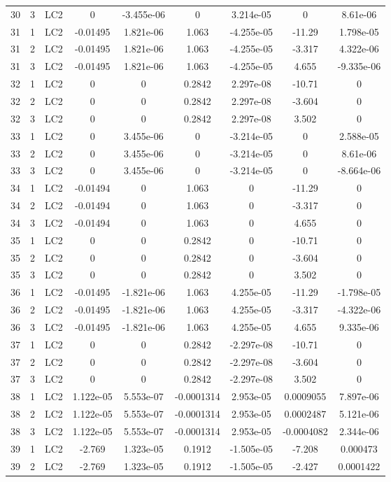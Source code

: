 \documentclass{article}%
\begin{document}
\begin{longtable}{| c c c | c c c c c c |}
30&3&LC2&0&{-}3.455e{-}06&0&3.214e{-}05&0&8.61e{-}06\\%
31&1&LC2&{-}0.01495&1.821e{-}06&1.063&{-}4.255e{-}05&{-}11.29&1.798e{-}05\\%
31&2&LC2&{-}0.01495&1.821e{-}06&1.063&{-}4.255e{-}05&{-}3.317&4.322e{-}06\\%
31&3&LC2&{-}0.01495&1.821e{-}06&1.063&{-}4.255e{-}05&4.655&{-}9.335e{-}06\\%
32&1&LC2&0&0&0.2842&2.297e{-}08&{-}10.71&0\\%
32&2&LC2&0&0&0.2842&2.297e{-}08&{-}3.604&0\\%
32&3&LC2&0&0&0.2842&2.297e{-}08&3.502&0\\%
33&1&LC2&0&3.455e{-}06&0&{-}3.214e{-}05&0&2.588e{-}05\\%
33&2&LC2&0&3.455e{-}06&0&{-}3.214e{-}05&0&8.61e{-}06\\%
33&3&LC2&0&3.455e{-}06&0&{-}3.214e{-}05&0&{-}8.664e{-}06\\%
34&1&LC2&{-}0.01494&0&1.063&0&{-}11.29&0\\%
34&2&LC2&{-}0.01494&0&1.063&0&{-}3.317&0\\%
34&3&LC2&{-}0.01494&0&1.063&0&4.655&0\\%
35&1&LC2&0&0&0.2842&0&{-}10.71&0\\%
35&2&LC2&0&0&0.2842&0&{-}3.604&0\\%
35&3&LC2&0&0&0.2842&0&3.502&0\\%
36&1&LC2&{-}0.01495&{-}1.821e{-}06&1.063&4.255e{-}05&{-}11.29&{-}1.798e{-}05\\%
36&2&LC2&{-}0.01495&{-}1.821e{-}06&1.063&4.255e{-}05&{-}3.317&{-}4.322e{-}06\\%
36&3&LC2&{-}0.01495&{-}1.821e{-}06&1.063&4.255e{-}05&4.655&9.335e{-}06\\%
37&1&LC2&0&0&0.2842&{-}2.297e{-}08&{-}10.71&0\\%
37&2&LC2&0&0&0.2842&{-}2.297e{-}08&{-}3.604&0\\%
37&3&LC2&0&0&0.2842&{-}2.297e{-}08&3.502&0\\%
38&1&LC2&1.122e{-}05&5.553e{-}07&{-}0.0001314&2.953e{-}05&0.0009055&7.897e{-}06\\%
38&2&LC2&1.122e{-}05&5.553e{-}07&{-}0.0001314&2.953e{-}05&0.0002487&5.121e{-}06\\%
38&3&LC2&1.122e{-}05&5.553e{-}07&{-}0.0001314&2.953e{-}05&{-}0.0004082&2.344e{-}06\\%
39&1&LC2&{-}2.769&1.323e{-}05&0.1912&{-}1.505e{-}05&{-}7.208&0.000473\\%
39&2&LC2&{-}2.769&1.323e{-}05&0.1912&{-}1.505e{-}05&{-}2.427&0.0001422\\%

\end{longtable}
\end{document}
